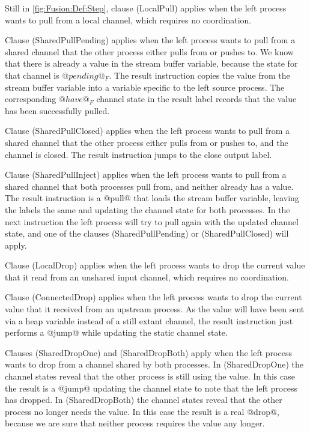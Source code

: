 Still in \autoref{fig:Fusion:Def:Step}, clause (LocalPull) applies when the left process wants to pull from a local channel, which requires no coordination.

Clause (SharedPullPending) applies when the left process wants to pull from a shared channel that the other process either pulls from or pushes to.
We know that there is already a value in the stream buffer variable, because the state for that channel is $@pending@_F$.
The result instruction copies the value from the stream buffer variable into a variable specific to the left source process.
The corresponding $@have@_F$ channel state in the result label records that the value has been successfully pulled.

Clause (SharedPullClosed) applies when the left process wants to pull from a shared channel that the other process either pulls from or pushes to, and the channel is closed.
The result instruction jumps to the close output label.

Clause (SharedPullInject) applies when the left process wants to pull from a shared channel that both processes pull from, and neither already has a value.
The result instruction is a @pull@ that loads the stream buffer variable, leaving the labels the same and updating the channel state for both processes.
In the next instruction the left process will try to pull again with the updated channel state, and one of the clauses (SharedPullPending) or (SharedPullClosed) will apply.

Clause (LocalDrop) applies when the left process wants to drop the current value that it read from an unshared input channel, which requires no coordination.

Clause (ConnectedDrop) applies when the left process wants to drop the current value that it received from an upstream process. As the value will have been sent via a heap variable instead of a still extant channel, the result instruction just performs a @jump@ while updating the static channel state.

Clauses (SharedDropOne) and (SharedDropBoth) apply when the left process wants to drop from a channel shared by both processes. In (SharedDropOne) the channel states reveal that the other process is still using the value. In this case the result is a @jump@ updating the channel state to note that the left process has dropped. In (SharedDropBoth) the channel states reveal that the other process no longer needs the value. In this case the result is a real @drop@, because we are sure that neither process requires the value any longer.


